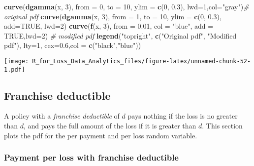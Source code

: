 \documentclass[]{book}
\newenvironment{Shaded}{\begin{snugshade}}{\end{snugshade}}
\newcommand{\KeywordTok}[1]{\textcolor[rgb]{0.13,0.29,0.53}{\textbf{#1}}}
\newcommand{\DataTypeTok}[1]{\textcolor[rgb]{0.13,0.29,0.53}{#1}}
\newcommand{\DecValTok}[1]{\textcolor[rgb]{0.00,0.00,0.81}{#1}}
\newcommand{\FloatTok}[1]{\textcolor[rgb]{0.00,0.00,0.81}{#1}}
\newcommand{\StringTok}[1]{\textcolor[rgb]{0.31,0.60,0.02}{#1}}
\newcommand{\CommentTok}[1]{\textcolor[rgb]{0.56,0.35,0.01}{\textit{#1}}}
\newcommand{\OtherTok}[1]{\textcolor[rgb]{0.56,0.35,0.01}{#1}}
\newcommand{\NormalTok}[1]{#1}
\theoremstyle{definition}
\theoremstyle{definition}
\theoremstyle{definition}
\theoremstyle{remark}
\begin{document}
\begin{Shaded}
\begin{Highlighting}[]
\KeywordTok{curve}\NormalTok{(}\KeywordTok{dgamma}\NormalTok{(x, }\DecValTok{3}\NormalTok{), }\DataTypeTok{from =} \DecValTok{0}\NormalTok{, }\DataTypeTok{to =} \DecValTok{10}\NormalTok{, }\DataTypeTok{ylim =} \KeywordTok{c}\NormalTok{(}\DecValTok{0}\NormalTok{, }\FloatTok{0.3}\NormalTok{), }\DataTypeTok{lwd=}\DecValTok{1}\NormalTok{,}\DataTypeTok{col=}\StringTok{"gray"}\NormalTok{)}\CommentTok{# original pdf}
\KeywordTok{curve}\NormalTok{(}\KeywordTok{dgamma}\NormalTok{(x, }\DecValTok{3}\NormalTok{), }\DataTypeTok{from =} \DecValTok{1}\NormalTok{, }\DataTypeTok{to =} \DecValTok{10}\NormalTok{, }\DataTypeTok{ylim =} \KeywordTok{c}\NormalTok{(}\DecValTok{0}\NormalTok{, }\FloatTok{0.3}\NormalTok{), }\DataTypeTok{add=}\OtherTok{TRUE}\NormalTok{, }\DataTypeTok{lwd=}\DecValTok{2}\NormalTok{)}
\KeywordTok{curve}\NormalTok{(}\KeywordTok{f}\NormalTok{(x, }\DecValTok{3}\NormalTok{), }\DataTypeTok{from =} \FloatTok{0.01}\NormalTok{, }\DataTypeTok{col =} \StringTok{"blue"}\NormalTok{, }\DataTypeTok{add =} \OtherTok{TRUE}\NormalTok{,}\DataTypeTok{lwd=}\DecValTok{2}\NormalTok{)     }\CommentTok{# modified pdf}
\KeywordTok{legend}\NormalTok{(}\StringTok{"topright"}\NormalTok{, }\KeywordTok{c}\NormalTok{(}\StringTok{"Original pdf"}\NormalTok{, }\StringTok{"Modified pdf"}\NormalTok{), }\DataTypeTok{lty=}\DecValTok{1}\NormalTok{, }\DataTypeTok{cex=}\FloatTok{0.6}\NormalTok{,}\DataTypeTok{col =} \KeywordTok{c}\NormalTok{(}\StringTok{"black"}\NormalTok{,}\StringTok{"blue"}\NormalTok{))}
\end{Highlighting}
\end{Shaded}

\texttt{[image: R\_for\_Loss\_Data\_Analytics\_files/figure-latex/unnamed-chunk-52-1.pdf]}

\subsection{Franchise deductible}\label{franchise-deductible}

A policy with a \emph{franchise deductible} of \(d\) pays nothing if the
loss is no greater than \(d\), and pays the full amount of the loss if
it is greater than \(d\). This section plots the pdf for the per payment
and per loss random variable.

\subsubsection{Payment per loss with franchise
deductible}\label{payment-per-loss-with-franchise-deductible}
\end{document}
